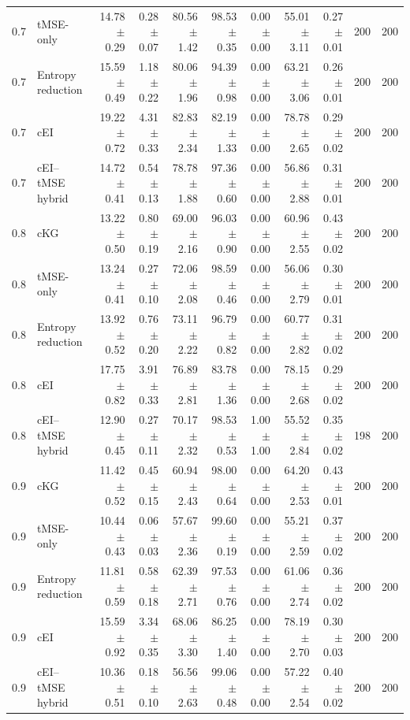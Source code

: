 \begin{tabular}{@{}clrrrrrrrrr@{}}
0.7 & tMSE-only & 14.78 $\pm$ 0.29 & 0.28 $\pm$ 0.07 & 80.56 $\pm$ 1.42 & 98.53 $\pm$ 0.35 & 0.00 $\pm$ 0.00 & 55.01 $\pm$ 3.11 & 0.27 $\pm$ 0.01 & 200 & 200 \\
0.7 & Entropy reduction & 15.59 $\pm$ 0.49 & 1.18 $\pm$ 0.22 & 80.06 $\pm$ 1.96 & 94.39 $\pm$ 0.98 & 0.00 $\pm$ 0.00 & 63.21 $\pm$ 3.06 & 0.26 $\pm$ 0.01 & 200 & 200 \\
0.7 & cEI & 19.22 $\pm$ 0.72 & 4.31 $\pm$ 0.33 & 82.83 $\pm$ 2.34 & 82.19 $\pm$ 1.33 & 0.00 $\pm$ 0.00 & 78.78 $\pm$ 2.65 & 0.29 $\pm$ 0.02 & 200 & 200 \\
0.7 & cEI--tMSE hybrid & 14.72 $\pm$ 0.41 & 0.54 $\pm$ 0.13 & 78.78 $\pm$ 1.88 & 97.36 $\pm$ 0.60 & 0.00 $\pm$ 0.00 & 56.86 $\pm$ 2.88 & 0.31 $\pm$ 0.01 & 200 & 200 \\
0.8 & cKG & 13.22 $\pm$ 0.50 & 0.80 $\pm$ 0.19 & 69.00 $\pm$ 2.16 & 96.03 $\pm$ 0.90 & 0.00 $\pm$ 0.00 & 60.96 $\pm$ 2.55 & 0.43 $\pm$ 0.02 & 200 & 200 \\
0.8 & tMSE-only & 13.24 $\pm$ 0.41 & 0.27 $\pm$ 0.10 & 72.06 $\pm$ 2.08 & 98.59 $\pm$ 0.46 & 0.00 $\pm$ 0.00 & 56.06 $\pm$ 2.79 & 0.30 $\pm$ 0.01 & 200 & 200 \\
0.8 & Entropy reduction & 13.92 $\pm$ 0.52 & 0.76 $\pm$ 0.20 & 73.11 $\pm$ 2.22 & 96.79 $\pm$ 0.82 & 0.00 $\pm$ 0.00 & 60.77 $\pm$ 2.82 & 0.31 $\pm$ 0.02 & 200 & 200 \\
0.8 & cEI & 17.75 $\pm$ 0.82 & 3.91 $\pm$ 0.33 & 76.89 $\pm$ 2.81 & 83.78 $\pm$ 1.36 & 0.00 $\pm$ 0.00 & 78.15 $\pm$ 2.68 & 0.29 $\pm$ 0.02 & 200 & 200 \\
0.8 & cEI--tMSE hybrid & 12.90 $\pm$ 0.45 & 0.27 $\pm$ 0.11 & 70.17 $\pm$ 2.32 & 98.53 $\pm$ 0.53 & 1.00 $\pm$ 1.00 & 55.52 $\pm$ 2.84 & 0.35 $\pm$ 0.02 & 198 & 200 \\
0.9 & cKG & 11.42 $\pm$ 0.52 & 0.45 $\pm$ 0.15 & 60.94 $\pm$ 2.43 & 98.00 $\pm$ 0.64 & 0.00 $\pm$ 0.00 & 64.20 $\pm$ 2.53 & 0.43 $\pm$ 0.01 & 200 & 200 \\
0.9 & tMSE-only & 10.44 $\pm$ 0.43 & 0.06 $\pm$ 0.03 & 57.67 $\pm$ 2.36 & 99.60 $\pm$ 0.19 & 0.00 $\pm$ 0.00 & 55.21 $\pm$ 2.59 & 0.37 $\pm$ 0.02 & 200 & 200 \\
0.9 & Entropy reduction & 11.81 $\pm$ 0.59 & 0.58 $\pm$ 0.18 & 62.39 $\pm$ 2.71 & 97.53 $\pm$ 0.76 & 0.00 $\pm$ 0.00 & 61.06 $\pm$ 2.74 & 0.36 $\pm$ 0.02 & 200 & 200 \\
0.9 & cEI & 15.59 $\pm$ 0.92 & 3.34 $\pm$ 0.35 & 68.06 $\pm$ 3.30 & 86.25 $\pm$ 1.40 & 0.00 $\pm$ 0.00 & 78.19 $\pm$ 2.70 & 0.30 $\pm$ 0.03 & 200 & 200 \\
0.9 & cEI--tMSE hybrid & 10.36 $\pm$ 0.51 & 0.18 $\pm$ 0.10 & 56.56 $\pm$ 2.63 & 99.06 $\pm$ 0.48 & 0.00 $\pm$ 0.00 & 57.22 $\pm$ 2.54 & 0.40 $\pm$ 0.02 & 200 & 200 \\
\bottomrule
\end{tabular}

